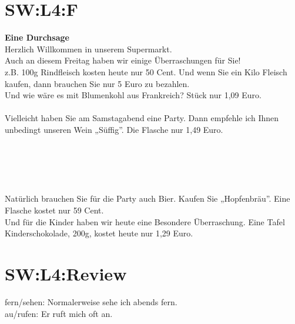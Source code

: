\section{SW:L4:F}
\textbf{Eine Durchsage} \\
Herzlich Willkommen in unserem Supermarkt. \\
Auch an diesem Freitag haben wir einige Überraschungen für Sie!  \\
z.B. 100g Rindfleisch kosten heute nur 50 Cent. Und wenn Sie ein Kilo Fleisch kaufen, dann brauchen Sie nur 5 Euro zu bezahlen.  \\
Und wie wäre es mit Blumenkohl aus Frankreich?  Stück nur 1,09 Euro.\\
\\
Vielleicht  haben Sie am Samstagabend eine Party. Dann empfehle ich Ihnen unbedingt unseren Wein „Süffig”.  Die Flasche nur 1,49 Euro.\\
\\
\\
\\
\\
\\
Natürlich brauchen Sie für die Party auch Bier. Kaufen Sie „Hopfenbräu”. Eine Flasche kostet nur 59 Cent. \\
Und für die Kinder haben wir heute eine Besondere Überraschung. Eine Tafel Kinderschokolade, 200g, kostet heute nur 1,29 Euro. \\

\section{SW:L4:Review}
fern/sehen: Normalerweise sehe ich abends fern. \\
au/rufen: Er ruft mich oft an. \\

